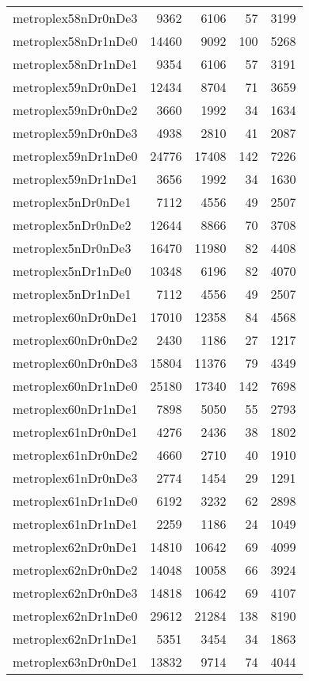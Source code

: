 \begin{tabular}{lrrrr}
metroplex58nDr0nDe3 & 9362 & 6106 & 57 & 3199 \\
metroplex58nDr1nDe0 & 14460 & 9092 & 100 & 5268 \\
metroplex58nDr1nDe1 & 9354 & 6106 & 57 & 3191 \\
metroplex59nDr0nDe1 & 12434 & 8704 & 71 & 3659 \\
metroplex59nDr0nDe2 & 3660 & 1992 & 34 & 1634 \\
metroplex59nDr0nDe3 & 4938 & 2810 & 41 & 2087 \\
metroplex59nDr1nDe0 & 24776 & 17408 & 142 & 7226 \\
metroplex59nDr1nDe1 & 3656 & 1992 & 34 & 1630 \\
metroplex5nDr0nDe1 & 7112 & 4556 & 49 & 2507 \\
metroplex5nDr0nDe2 & 12644 & 8866 & 70 & 3708 \\
metroplex5nDr0nDe3 & 16470 & 11980 & 82 & 4408 \\
metroplex5nDr1nDe0 & 10348 & 6196 & 82 & 4070 \\
metroplex5nDr1nDe1 & 7112 & 4556 & 49 & 2507 \\
metroplex60nDr0nDe1 & 17010 & 12358 & 84 & 4568 \\
metroplex60nDr0nDe2 & 2430 & 1186 & 27 & 1217 \\
metroplex60nDr0nDe3 & 15804 & 11376 & 79 & 4349 \\
metroplex60nDr1nDe0 & 25180 & 17340 & 142 & 7698 \\
metroplex60nDr1nDe1 & 7898 & 5050 & 55 & 2793 \\
metroplex61nDr0nDe1 & 4276 & 2436 & 38 & 1802 \\
metroplex61nDr0nDe2 & 4660 & 2710 & 40 & 1910 \\
metroplex61nDr0nDe3 & 2774 & 1454 & 29 & 1291 \\
metroplex61nDr1nDe0 & 6192 & 3232 & 62 & 2898 \\
metroplex61nDr1nDe1 & 2259 & 1186 & 24 & 1049 \\
metroplex62nDr0nDe1 & 14810 & 10642 & 69 & 4099 \\
metroplex62nDr0nDe2 & 14048 & 10058 & 66 & 3924 \\
metroplex62nDr0nDe3 & 14818 & 10642 & 69 & 4107 \\
metroplex62nDr1nDe0 & 29612 & 21284 & 138 & 8190 \\
metroplex62nDr1nDe1 & 5351 & 3454 & 34 & 1863 \\
metroplex63nDr0nDe1 & 13832 & 9714 & 74 & 4044 \\

\end{tabular}
